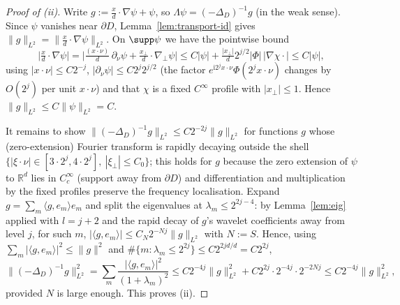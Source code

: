 \documentclass[11pt]{amsart}
\newcommand{\R}{\mathbb{R}}
\newcommand{\1}{\mathbf{1}}
\begin{document}
\begin{proof}[Proof of (ii)]
Write $g:=\frac{x}{d}\cdot\nabla\psi+\psi$, so
$\Lambda\psi=(-\Delta_D)^{-1}g$ (in the weak sense). Since $\psi$ vanishes
near $\partial D$, Lemma~\ref{lem:transport-id} gives
$\|g\|_{L^2}=\|\tfrac{x}{d}\cdot\nabla\psi\|_{L^2}$.
On $\supp\psi$ we have the pointwise bound
\[
\Big|\tfrac{x}{d}\cdot\nabla\psi\Big|
=\Big|\tfrac{(x\cdot\nu)}{d}\,\partial_\nu\psi
+\tfrac{x_\perp}{d}\cdot\nabla_\perp\psi\Big|
\le C|\psi|+\tfrac{|x_\perp|}{d}2^{j/2}|\Phi|\,|\nabla\chi\cdot|\le C|\psi|,
\]
using $|x\cdot\nu|\le C2^{-j}$, $|\partial_\nu\psi|\le C2^j2^{j/2}$ (the factor
$e^{\mathrm{i}2^jx\cdot\nu}\Phi(2^jx\cdot\nu)$ changes by $O(2^j)$ per unit
$x\cdot\nu$) and that $\chi$ is a fixed $C^\infty$ profile with
$|x_\perp|\le1$. Hence $\|g\|_{L^2}\le C\|\psi\|_{L^2}=C$.

It remains to show $\|(-\Delta_D)^{-1}g\|_{L^2}\le C2^{-2j}\|g\|_{L^2}$ for
functions $g$ whose (zero-extension) Fourier transform is rapidly decaying
outside the shell $\{|\xi\cdot\nu|\in[3\cdot2^j,4\cdot2^j],\ |\xi_\perp|\le
C_0\}$; this holds for $g$ because the zero extension of $\psi$ to $\R^d$
lies in $C^\infty_c$ (support away from $\partial D$) and differentiation and
multiplication by the fixed profiles preserve the frequency localisation.
Expand $g=\sum_m\langle g,e_m\rangle e_m$ and split the eigenvalues at
$\lambda_m\le 2^{2j-4}$: by Lemma~\ref{lem:eig} applied with
$l=j+2$ and the rapid decay of $g$'s wavelet coefficients away from level
$j$, for such $m$,
$|\langle g,e_m\rangle|\le C_N2^{-Nj}\|g\|_{L^2}$ with $N:=S$. Hence, using
$\sum_m|\langle g,e_m\rangle|^2\le\|g\|^2$ and
$\#\{m:\lambda_m\le2^{2j}\}\le C2^{2jd/d}=C2^{2j}$,
\[
\|(-\Delta_D)^{-1}g\|_{L^2}^2
=\sum_m\frac{|\langle g,e_m\rangle|^2}{(1+\lambda_m)^2}
\le C2^{-4j}\|g\|^2_{L^2}+C2^{2j}\cdot2^{-4j}\cdot 2^{-2Nj}
\le C2^{-4j}\|g\|_{L^2}^2 ,
\]
provided $N$ is large enough. This proves (ii).
\end{proof}
\end{document}
